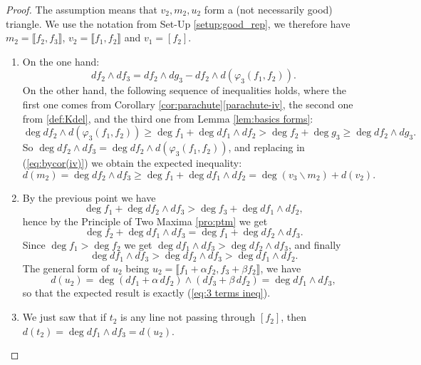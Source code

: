 \documentclass[reqno,oneside,11pt]{amsart}
\theoremstyle{plain}
\theoremstyle{definition}
\renewcommand{\phi}{\varphi}
\newcommand{\llb}{\llbracket}
\newcommand{\rrb}{\rrbracket}
\renewcommand{\ge}{\geqslant}
\begin{document}
\begin{proof}
The assumption means that $v_2, m_2, u_2$ form a (not necessarily good) triangle.
We use the notation from Set-Up \ref{setup:good_rep}, we therefore have $m_2 =
\llb f_2, f_3 \rrb$, $v_2 = \llb f_1, f_2 \rrb$ and $v_1 = [f_2]$.
\begin{enumerate}[wide]
\item
On the one hand:
$$df_2 \wedge df_3 = df_2 \wedge dg_3 - df_2 \wedge d (\phi_3(f_1,f_2)).$$
On the other hand, the following sequence of inequalities holds, where the first one comes from Corollary \ref{cor:parachute}\ref{parachute-iv}, the second one from \ref{def:Kdel}, and the third one from Lemma \ref{lem:basics forms}:
\begin{equation} \label{eq:bycor(iv)}
\deg df_2 \wedge d (\phi_3(f_1,f_2)) \ge
 \deg f_1 + \deg df_1\wedge df_2 > \deg f_2 + \deg g_3 \ge \deg df_2 \wedge dg_3.
\end{equation}
So $\deg df_2 \wedge df_3 = \deg df_2 \wedge d (\phi_3(f_1,f_2))$, and replacing in (\ref{eq:bycor(iv)}) we obtain the expected inequality:
\begin{equation*}
d(m_2) = \deg df_2 \wedge df_3 \ge \deg f_1 + \deg df_1 \wedge df_2 = \deg (v_3 \smallsetminus m_2) + d(v_2).
\end{equation*}

\item
By the previous point we have
$$\deg f_1 + \deg df_2 \wedge df_3 > \deg f_3 + \deg df_1 \wedge df_2,$$
hence by the Principle of Two Maxima \ref{pro:ptm} we get
\begin{equation} \label{eq:P 2 M}
\deg f_2 + \deg df_1 \wedge df_3 = \deg f_1 + \deg df_2 \wedge df_3.
\end{equation}
Since $\deg f_1 > \deg f_2$ we get $\deg df_1 \wedge df_3 > \deg df_2 \wedge
df_3$, and finally
\begin{equation} \label{eq:3 terms ineq}
\deg df_1 \wedge df_3 > \deg df_2 \wedge df_3 > \deg df_1 \wedge df_2.
\end{equation}
The general form of $u_2$ being $u_2 = \llb f_1 + \alpha f_2, f_3 + \beta
f_2 \rrb$, we have
\begin{equation*}
d(u_2) = \deg (df_1 + \alpha\, df_2) \wedge (df_3 + \beta\, df_2) = \deg df_1
\wedge df_3,
\end{equation*}
so that the expected result is exactly (\ref{eq:3 terms ineq}).

\item We just saw that if $t_2$ is any line not passing through $[f_2]$, then
$d(t_2) = \deg df_1 \wedge df_3 = d(u_2)$.


\end{enumerate}
\end{proof}
\end{document}
